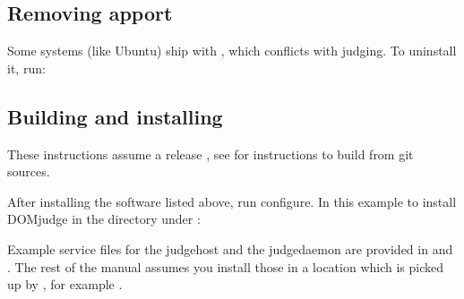 \documentclass[a4paper,10pt,english,openany]{sphinxmanual}
\begin{document}
\subsection{Removing apport}
\label{\detokenize{install-judgehost:removing-apport}}
\sphinxAtStartPar
Some systems (like Ubuntu) ship with , which conflicts with judging.
To uninstall it, run:

\begin{sphinxVerbatim}[commandchars=\\\{\}]
   
\end{sphinxVerbatim}


\subsection{Building and installing}
\label{\detokenize{install-judgehost:building-and-installing}}\label{\detokenize{install-judgehost:installing-judgehost}}
\sphinxAtStartPar
These instructions assume a release , see {\hyperref[\detokenize{develop:bootstrap}]{}}
for instructions to build from git sources.

\sphinxAtStartPar
After installing the software listed above, run configure. In this
example to install DOMjudge in the directory  under :

\begin{sphinxVerbatim}[commandchars=\\\{\}]
 
 
  
\end{sphinxVerbatim}

\sphinxAtStartPar
Example service files for the judgehost and the judgedaemon are provided in
 and . The rest of the manual assumes you install those
in a location which is picked up by , for example .

\begin{sphinxVerbatim}[commandchars=\\\{\}]
  
  
\end{sphinxVerbatim}
\end{document}
